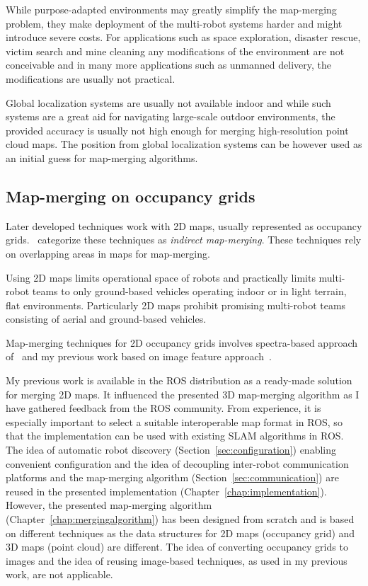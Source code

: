 While purpose-adapted environments may greatly simplify the map-merging problem, they make deployment of the multi-robot systems harder and might introduce severe costs. For applications such as space exploration, disaster rescue, victim search and mine cleaning any modifications of the environment are not conceivable and in many more applications such as unmanned delivery, the modifications are usually not practical.

Global localization systems are usually not available indoor and while such systems are a great aid for navigating large-scale outdoor environments, the provided accuracy is usually not high enough for merging high-resolution point cloud maps. The position from global localization systems can be however used as an initial guess for map-merging algorithms.

\subsection{Map-merging on occupancy grids}
\label{sec:map-merging-grids}

Later developed techniques work with \gls{2D} maps, usually represented as occupancy grids. \citet{lee2012survey}~categorize these techniques as \textit{indirect map-merging}. These techniques rely on overlapping areas in maps for map-merging.

Using \gls{2D} maps limits operational space of robots and practically limits multi-robot teams to only ground-based vehicles operating indoor or in light terrain, flat environments. Particularly \gls{2D} maps prohibit promising multi-robot teams consisting of aerial and ground-based vehicles.

Map-merging techniques for \gls{2D} occupancy grids involves spectra-based approach of~\citet{carpin2008spectra} and my previous work based on image feature approach~\citep{Horner2016}.

My previous work is available in the \gls{ROS} distribution as a ready-made solution for merging \gls{2D} maps. It influenced the presented \gls{3D} map-merging algorithm as I have gathered feedback from the \gls{ROS} community. From experience, it is especially important to select a suitable interoperable map format in \gls{ROS}, so that the implementation can be used with existing \gls{SLAM} algorithms in \gls{ROS}. The idea of automatic robot discovery (Section~\ref{sec:configuration}) enabling convenient configuration and the idea of decoupling inter-robot communication platforms and the map-merging algorithm (Section~\ref{sec:communication}) are reused in the presented implementation (Chapter~\ref{chap:implementation}). However, the presented map-merging algorithm (Chapter~\ref{chap:mergingalgorithm}) has been designed from scratch and is based on different techniques as the data structures for \gls{2D} maps (occupancy grid) and \gls{3D} maps (point cloud) are different. The idea of converting occupancy grids to images and the idea of reusing image-based techniques, as used in my previous work, are not applicable.


